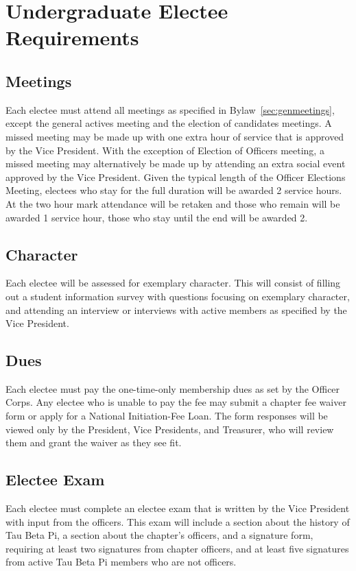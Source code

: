 \chapter{Undergraduate Electee Requirements}\label{sec:ugradreqs}
\section{Meetings} Each electee must attend all meetings as specified in Bylaw~\ref{sec:genmeetings}, except the general actives meeting and the election of candidates  meetings. A missed meeting may be made up with one extra hour of service that is approved by the Vice President. 
With the exception of Election of Officers meeting, a missed meeting may alternatively be made up by attending an extra social event approved by the Vice President. Given the typical length of the Officer Elections Meeting, electees who stay for the full duration will be awarded 2 service hours. At the two hour mark attendance will be retaken and those who remain will be awarded 1 service hour, those who stay until the end will be awarded 2.
\section{Character} Each electee will be assessed for exemplary character. This will consist of filling out a student information survey with questions focusing on exemplary character, and attending  an interview or interviews with active members as specified by the Vice President. %
\section{Dues} Each electee must pay the one-time-only membership dues as set by the Officer Corps. Any electee who is unable to pay the fee may submit a chapter fee waiver form or apply for a National Initiation-Fee Loan. The form responses will be viewed only by the President, Vice Presidents, and Treasurer, who will review them and grant the waiver as they see fit.
\section{Electee Exam} Each electee must complete an electee exam that is written by the Vice President with input from the officers. This exam will include a section about the history of Tau Beta Pi, a section about the chapter's officers, and a signature form, requiring at least two signatures from chapter officers, and at least five signatures from active Tau Beta Pi members who are not officers.
